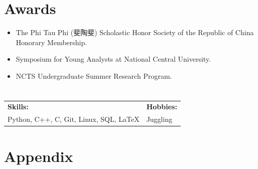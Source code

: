 \documentclass[a4paper,10pt]{article}
\begin{document}
\section*{Awards}
\begin{itemize}[leftmargin=30pt]
    \item The Phi Tau Phi (斐陶斐) Scholastic Honor Society of the Republic of China Honorary Membership.
    \item Symposium for Young Analysts at National Central University.
    \item NCTS Undergraduate Summer Research Program.
\end{itemize}

\section*{}
\begin{tabularx}{\textwidth}{X X}
    \textbf{Skills:} & \textbf{Hobbies:} \\
    Python, C++, C, Git, Linux, SQL, \LaTeX & Juggling \\
\end{tabularx}

\section*{Appendix}
\end{document}

